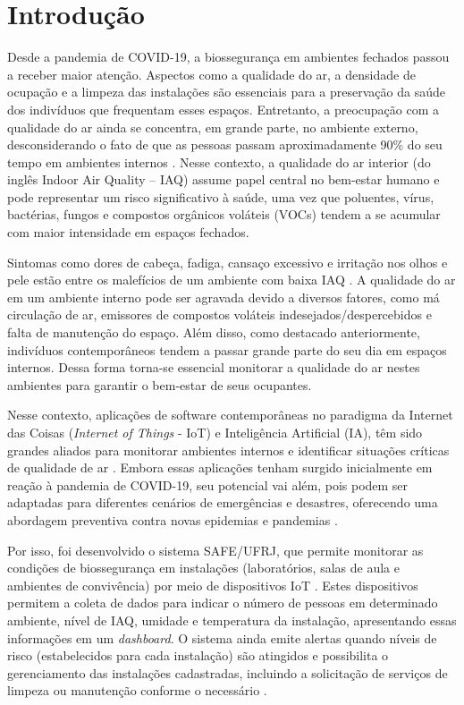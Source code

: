 \newpage
\section{Introdução}
\label{sec:introducao}

Desde a pandemia de COVID-19, a biossegurança em ambientes fechados passou a receber maior atenção. Aspectos como a qualidade do ar, a densidade de ocupação e a limpeza das instalações são essenciais para a preservação da saúde dos indivíduos que frequentam esses espaços. Entretanto, a preocupação com a qualidade do ar ainda se concentra, em grande parte, no ambiente externo, desconsiderando o fato de que as pessoas passam aproximadamente 90\% do seu tempo em ambientes internos \cite{WHO2014MultipleExposure}. Nesse contexto, a qualidade do ar interior (do inglês Indoor Air Quality – IAQ) assume papel central no bem-estar humano e pode representar um risco significativo à saúde, uma vez que poluentes, vírus, bactérias, fungos e compostos orgânicos voláteis (VOCs) tendem a se acumular com maior intensidade em espaços fechados.

Sintomas como dores de cabeça, fadiga, cansaço excessivo e irritação nos olhos e pele estão entre os malefícios de um ambiente com baixa IAQ \cite{SAFE-IOT}. A qualidade do ar em um ambiente interno pode ser agravada devido a diversos fatores, como má circulação de ar, emissores de compostos voláteis indesejados/despercebidos e falta de manutenção do espaço. Além disso, como destacado anteriormente, indivíduos contemporâneos tendem a passar grande parte do seu dia em espaços internos. Dessa forma torna-se essencial monitorar a qualidade do ar nestes ambientes para garantir o bem-estar de seus ocupantes. 

Nesse contexto, aplicações de software contemporâneas no paradigma da Internet das Coisas (\textit{Internet of Things} - IoT) e Inteligência Artificial (IA), têm sido grandes aliados para monitorar ambientes internos e identificar situações críticas de qualidade de ar \cite{kelly2020internet}. Embora essas aplicações tenham surgido inicialmente em reação à pandemia de COVID-19, seu potencial vai além, pois podem ser adaptadas para diferentes cenários de emergências e desastres, oferecendo uma abordagem preventiva contra novas epidemias e pandemias \cite{MoniPaEp, SAFE-IOT, Oliveira2025HospitaisSeguros}.

Por isso, foi desenvolvido o sistema SAFE/UFRJ, que permite monitorar as condições de biossegurança \cite{UFRJBiosseguranca2020} em instalações (laboratórios, salas de aula e ambientes de convivência) por meio de dispositivos IoT \cite{rios2022exploring}. Estes dispositivos permitem a coleta de dados para indicar o número de pessoas em determinado ambiente, nível de IAQ, umidade e temperatura da instalação, apresentando essas informações em um \textit{dashboard}. O sistema ainda emite alertas quando níveis de risco (estabelecidos para cada instalação) são atingidos e possibilita o gerenciamento das instalações cadastradas, incluindo a solicitação de serviços de limpeza ou manutenção conforme o necessário \cite{SAFE-IOT}.


